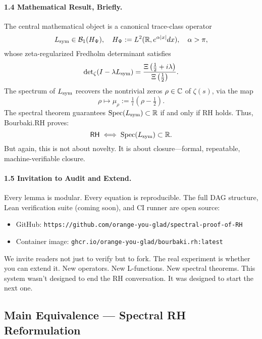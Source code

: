 \paragraph*{1.4 Mathematical Result, Briefly.}
The central mathematical object is a canonical trace-class operator
\[
L_{\mathrm{sym}} \in \mathcal{B}_1(H_{\Psi}), \quad H_{\Psi} := L^2(\mathbb{R}, e^{\alpha|x|} dx), \quad \alpha > \pi,
\]
whose zeta-regularized Fredholm determinant satisfies
\[
\det\nolimits_{\zeta}(I - \lambda L_{\mathrm{sym}}) = \frac{\Xi\left(\tfrac{1}{2} + i\lambda\right)}{\Xi\left(\tfrac{1}{2}\right)}.
\]
The spectrum of \( L_{\mathrm{sym}} \) recovers the nontrivial zeros \( \rho \in \mathbb{C} \) of \( \zeta(s) \), via the map
\[
\rho \mapsto \mu_\rho := \tfrac{1}{i}(\rho - \tfrac{1}{2}).
\]
The spectral theorem guarantees \( \operatorname{Spec}(L_{\mathrm{sym}}) \subset \mathbb{R} \) if and only if RH holds. Thus, Bourbaki.RH proves:
\[
\mathsf{RH} \iff \operatorname{Spec}(L_{\mathrm{sym}}) \subset \mathbb{R}.
\]
But again, this is not about novelty. It is about closure—formal, repeatable, machine-verifiable closure.

\paragraph*{1.5 Invitation to Audit and Extend.}
Every lemma is modular. Every equation is reproducible. The full DAG structure, Lean verification suite (coming soon), and CI runner are open source:
\begin{itemize}
  \item GitHub: \texttt{https://github.com/orange-you-glad/spectral-proof-of-RH}
  \item Container image: \texttt{ghcr.io/orange-you-glad/bourbaki.rh:latest}
\end{itemize}
We invite readers not just to verify but to fork. The real experiment is whether you can extend it. New operators. New L-functions. New spectral theorems. This system wasn’t designed to end the RH conversation. It was designed to start the next one.

\medskip

\subsection*{Main Equivalence — Spectral RH Reformulation}
\hfill \break

